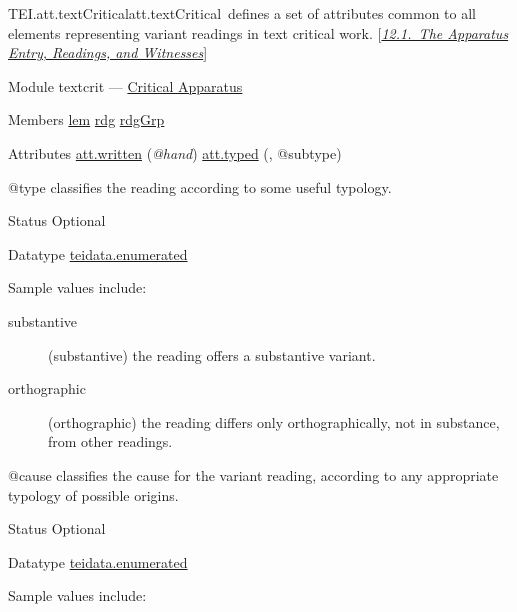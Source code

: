 \begin{reflist}
\item[]\begin{specHead}{TEI.att.textCritical}{att.textCritical} defines a set of attributes common to all elements representing variant readings in text critical work. [\textit{\hyperref[TCAPLL]{12.1.\ The Apparatus Entry, Readings, and Witnesses}}]\end{specHead} 
    \item[{Module}]
  textcrit — \hyperref[TC]{Critical Apparatus}
    \item[{Members}]
  \hyperref[TEI.lem]{lem} \hyperref[TEI.rdg]{rdg} \hyperref[TEI.rdgGrp]{rdgGrp}
    \item[{Attributes}]
  \hyperref[TEI.att.written]{att.written} (\textit{@hand}) \hyperref[TEI.att.typed]{att.typed} (, @subtype) \hfil\\[-10pt]\begin{sansreflist}
    \item[@type]
  classifies the reading according to some useful typology.
\begin{reflist}
    \item[{Status}]
  Optional
    \item[{Datatype}]
  \hyperref[TEI.teidata.enumerated]{teidata.enumerated}
    \item[{Sample values include:}]
  \begin{description}

\item[{substantive}](substantive) the reading offers a substantive variant.
\item[{orthographic}](orthographic) the reading differs only orthographically, not in substance, from other readings.
\end{description} 
\end{reflist}  
    \item[@cause]
  classifies the cause for the variant reading, according to any appropriate typology of possible origins.
\begin{reflist}
    \item[{Status}]
  Optional
    \item[{Datatype}]
  \hyperref[TEI.teidata.enumerated]{teidata.enumerated}
    \item[{Sample values include:}]
  \begin{description}


\end{description}
\end{reflist}
\end{sansreflist}
\end{reflist}
